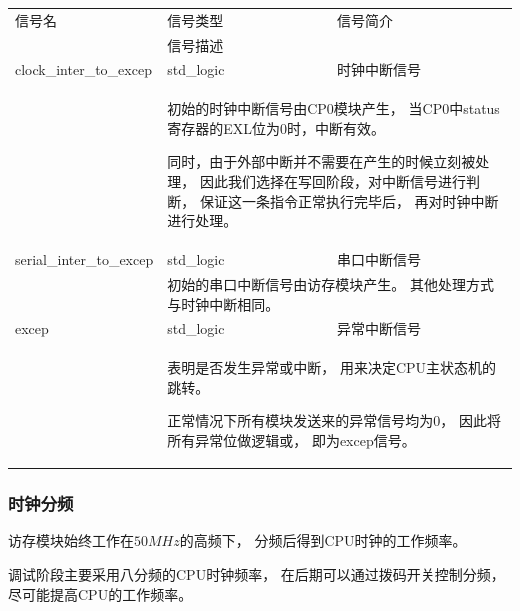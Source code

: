             \begin{tabularx}{\textwidth}{lll}
                \toprule
                信号名          & 信号类型  & 信号简介 \\
                \cmidrule(l){2-3}
                &
                \multicolumn{2}{X}{信号描述} \\
                \midrule
                clock\_inter\_to\_excep   & std\_logic    & 时钟中断信号 \\
                \cmidrule(l){2-3}
                &
                \multicolumn{2}{X}{
                    初始的时钟中断信号由CP0模块产生，%
                    当CP0中status寄存器的EXL位为0时，中断有效。

                    同时，由于外部中断并不需要在产生的时候立刻被处理，%
                    因此我们选择在写回阶段，对中断信号进行判断，%
                    保证这一条指令正常执行完毕后，%
                    再对时钟中断进行处理。
                } \\
                \midrule
                serial\_inter\_to\_excep   & std\_logic    & 串口中断信号 \\
                \cmidrule(l){2-3}
                &
                \multicolumn{2}{X}{
                    初始的串口中断信号由访存模块产生。%
                    其他处理方式与时钟中断相同。
                } \\
                \midrule
                excep   & std\_logic    & 异常中断信号 \\
                \cmidrule(l){2-3}
                &
                \multicolumn{2}{X}{
                    表明是否发生异常或中断，%
                    用来决定CPU主状态机的跳转。%

                    正常情况下所有模块发送来的异常信号均为0，%
                    因此将所有异常位做逻辑或，%
                    即为excep信号。
                } \\
                \bottomrule
            \end{tabularx}

        \subsubsection{时钟分频}
            访存模块始终工作在$50MHz$的高频下，%
            分频后得到CPU时钟的工作频率。%

            调试阶段主要采用八分频的CPU时钟频率，%
            在后期可以通过拨码开关控制分频，%
            尽可能提高CPU的工作频率。
